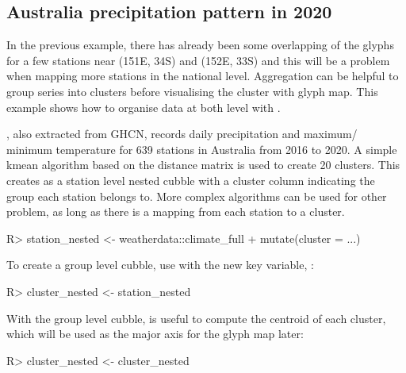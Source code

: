 \documentclass[
]{jss}
\begin{document}
\hypertarget{australia-precipitation-pattern-in-2020}{%
\subsection{Australia precipitation pattern in
2020}\label{australia-precipitation-pattern-in-2020}}

In the previous example, there has already been some overlapping of the
glyphs for a few stations near (151E, 34S) and (152E, 33S) and this will
be a problem when mapping more stations in the national level.
Aggregation can be helpful to group series into clusters before
visualising the cluster with glyph map. This example shows how to
organise data at both level with .

, also extracted from GHCN, records
daily precipitation and maximum/ minimum temperature for 639 stations in
Australia from 2016 to 2020. A simple kmean algorithm based on the
distance matrix is used to create 20 clusters. This creates
 as a station level nested cubble with a cluster
column indicating the group each station belongs to. More complex
algorithms can be used for other problem, as long as there is a mapping
from each station to a cluster.

\begin{CodeChunk}
\begin{CodeInput}
R> station_nested <- weatherdata::climate_full %
+   mutate(cluster = ...)
\end{CodeInput}
\end{CodeChunk}

To create a group level cubble, use  with the new key
variable, :

\begin{CodeChunk}
\begin{CodeInput}
R> cluster_nested <- station_nested %
\end{CodeInput}
\end{CodeChunk}

With the group level cubble,  is useful to compute
the centroid of each cluster, which will be used as the major axis for
the glyph map later:

\begin{CodeChunk}
\begin{CodeInput}
R> cluster_nested <- cluster_nested %
\end{CodeInput}
\end{CodeChunk}
\end{document}
